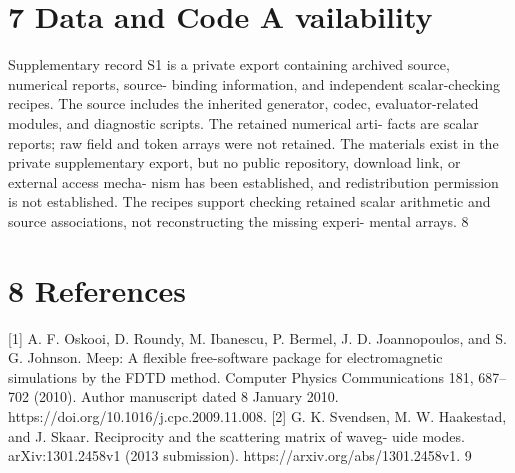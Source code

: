 \documentclass[11pt]{article}
\begin{document}
\section*{7 Data and Code A vailability}

Supplementary record S1 is a private export containing archived source, numerical reports, source-
binding information, and independent scalar-checking recipes. The source includes the inherited
generator, codec, evaluator-related modules, and diagnostic scripts. The retained numerical arti-
facts are scalar reports; raw field and token arrays were not retained. The materials exist in the
private supplementary export, but no public repository, download link, or external access mecha-
nism has been established, and redistribution permission is not established. The recipes support
checking retained scalar arithmetic and source associations, not reconstructing the missing experi-
mental arrays.
8


\section*{8 References}

[1] A. F. Oskooi, D. Roundy, M. Ibanescu, P. Bermel, J. D. Joannopoulos, and S. G. Johnson.
Meep: A flexible free-software package for electromagnetic simulations by the FDTD method.
Computer Physics Communications 181, 687–702 (2010). Author manuscript dated 8 January
2010. https://doi.org/10.1016/j.cpc.2009.11.008.
[2] G. K. Svendsen, M. W. Haakestad, and J. Skaar. Reciprocity and the scattering matrix of waveg-
uide modes. arXiv:1301.2458v1 (2013 submission). https://arxiv.org/abs/1301.2458v1.
9
\end{document}
